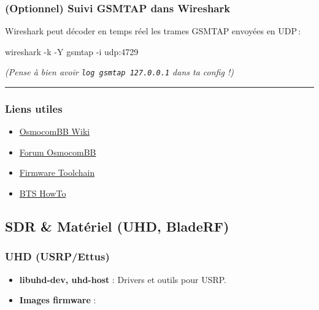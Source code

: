 \documentclass[
  french,
]{article}
\newenvironment{Shaded}{\begin{snugshade}}{\end{snugshade}}
\newcommand{\AttributeTok}[1]{\textcolor[rgb]{0.13,0.29,0.53}{#1}}
\newcommand{\ExtensionTok}[1]{#1}
\newcommand{\NormalTok}[1]{#1}
\providecommand{\tightlist}{%
  \setlength{\itemsep}{0pt}\setlength{\parskip}{0pt}}
\begin{document}
\subsubsection{(Optionnel) Suivi GSMTAP dans
Wireshark}\label{optionnel-suivi-gsmtap-dans-wireshark}

Wireshark peut décoder en temps réel les trames GSMTAP envoyées en
UDP\,:

\begin{Shaded}
\begin{Highlighting}[]
\ExtensionTok{wireshark} \AttributeTok{{-}k} \AttributeTok{{-}Y}\NormalTok{ gsmtap }\AttributeTok{{-}i}\NormalTok{ udp:4729}
\end{Highlighting}
\end{Shaded}

\emph{(Pense à bien avoir \texttt{log\ gsmtap\ 127.0.0.1} dans ta config
!)}

\begin{center}\rule{0.5\linewidth}{0.5pt}\end{center}

\subsubsection{Liens utiles}\label{liens-utiles-1}

\begin{itemize}
\tightlist
\item
  \href{https://osmocom.org/projects/baseband/wiki}{OsmocomBB Wiki}
\item
  \href{https://lists.osmocom.org/mailman/listinfo/baseband-devel}{Forum
  OsmocomBB}
\item
  \href{https://downloads.osmocom.org/binaries/toolchain/}{Firmware
  Toolchain}
\item
  \href{https://osmocom.org/projects/baseband/wiki/CalypsoBTS}{BTS
  HowTo}
\end{itemize}

\subsection{SDR \& Matériel (UHD,
BladeRF)}\label{sdr-matuxe9riel-uhd-bladerf}

\subsubsection{UHD (USRP/Ettus)}\label{uhd-usrpettus}

\begin{itemize}
\item
  \textbf{libuhd-dev, uhd-host} : Drivers et outils pour USRP.
\item
  \textbf{Images firmware} :
\end{itemize}
\end{document}
